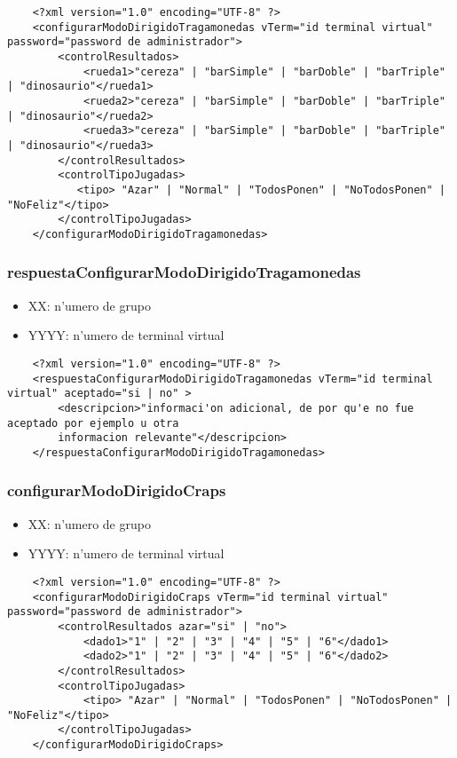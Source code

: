 \begin{verbatim}
    <?xml version="1.0" encoding="UTF-8" ?>
    <configurarModoDirigidoTragamonedas vTerm="id terminal virtual" password="password de administrador">
        <controlResultados>
            <rueda1>"cereza" | "barSimple" | "barDoble" | "barTriple" | "dinosaurio"</rueda1>
            <rueda2>"cereza" | "barSimple" | "barDoble" | "barTriple" | "dinosaurio"</rueda2>
            <rueda3>"cereza" | "barSimple" | "barDoble" | "barTriple" | "dinosaurio"</rueda3>
        </controlResultados>
        <controlTipoJugadas>
           <tipo> "Azar" | "Normal" | "TodosPonen" | "NoTodosPonen" | "NoFeliz"</tipo>
        </controlTipoJugadas>
    </configurarModoDirigidoTragamonedas>
\end{verbatim}


\subsubsection{respuestaConfigurarModoDirigidoTragamonedas}
 
\begin{itemize}
    \item{XX: n'umero de grupo}
    \item{YYYY: n'umero de terminal virtual}
\end{itemize}

\begin{verbatim}
    <?xml version="1.0" encoding="UTF-8" ?>
    <respuestaConfigurarModoDirigidoTragamonedas vTerm="id terminal virtual" aceptado="si | no" >
        <descripcion>"informaci'on adicional, de por qu'e no fue aceptado por ejemplo u otra
        informacion relevante"</descripcion>
    </respuestaConfigurarModoDirigidoTragamonedas>
\end{verbatim}


\subsubsection{configurarModoDirigidoCraps}
 
\begin{itemize}
    \item{XX: n'umero de grupo}
    \item{YYYY: n'umero de terminal virtual}
\end{itemize}

\begin{verbatim}
    <?xml version="1.0" encoding="UTF-8" ?>
    <configurarModoDirigidoCraps vTerm="id terminal virtual" password="password de administrador">
        <controlResultados azar="si" | "no">
            <dado1>"1" | "2" | "3" | "4" | "5" | "6"</dado1>
            <dado2>"1" | "2" | "3" | "4" | "5" | "6"</dado2>
        </controlResultados>
        <controlTipoJugadas>
            <tipo> "Azar" | "Normal" | "TodosPonen" | "NoTodosPonen" | "NoFeliz"</tipo>
        </controlTipoJugadas>
    </configurarModoDirigidoCraps>
\end{verbatim}



